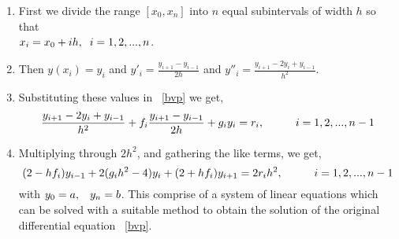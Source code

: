 \documentclass[aima203_lecturenotes_ku.tex]{subfiles}
\begin{document}
\begin{enumerate}
\item First we divide the range $[x_0, x_n]$ into $n$ equal subintervals of width $h$ so that \\ $x_i = x_0 + ih, \hspace{2mm} i=1,2,...,n$.

\item Then $y(x_i) = y_i$ and $\displaystyle y'_i = \frac{y_{i+1} - y_{i-1}}{2h}$ and $\displaystyle y''_i = \frac{y_{i+1} - 2y_i+ y_{i-1}}{h^2}$.

\item Substituting these values in ~\ref{bvp} we get,
  \begin{equation*}
    \frac{y_{i+1} - 2y_i+ y_{i-1}}{h^2} + f_i \frac{y_{i+1} - y_{i-1}}{2h} + g_i y_i = r_i, \hspace{10mm} i=1,2,...,n-1
  \end{equation*}
\item Multiplying through $2h^2$, and gathering the like terms, we get,
  $$(2-hf_i)y_{i-1} + 2(g_ih^2 -4)y_i + (2+hf_i)y_{i+1} = 2r_ih^2, \hspace{10mm} i=1,2,...,n-1 $$ with $y_0 = a, \hspace{3mm} y_n = b$.
  This comprise of a system of linear equations which can be solved with a suitable method to obtain the solution of the original differential equation ~\ref{bvp}.
 \end{enumerate}
\end{document}
